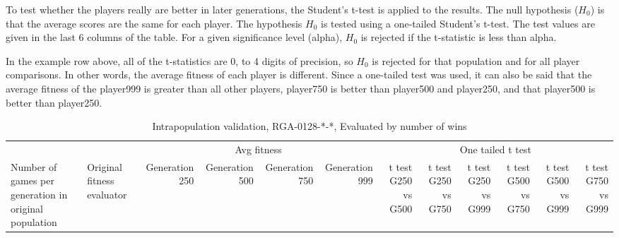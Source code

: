 \begin{landscape}
To test whether the players really are better in later generations, the
Student's t-test is applied to the results. The null hypothesis ($H_{0}$) is
that the average scores are the same for each player. The hypothesis $H_{0}$ 
is tested using a
one-tailed Student's t-test. The test values are given in the last 6 columns of
the table. For a given significance level (alpha), $H_{0}$ is rejected if the
t-statistic is less than alpha.

In the example row above, all of the t-statistics are 0, to 4 digits of
precision, so $H_{0}$ is rejected for that population and for all player
comparisons. In other words, the average fitness of each player is different.
Since a one-tailed test was used, it can also be said that the average fitness
of the player999 is greater than all other players, player750 is better than
player500 and player250, and that player500 is better than player250.

\clearpage

\begin{table}[ht]
  \centering
    \caption{Intrapopulation validation, RGA-0128-*-*, Evaluated by number of
    wins}
    \begin{tabularx}{\linewidth}{|p{1in}|p{1in}|r|r|r|r|r|r|r|r|r|r|}
\cline{3-12}    \multicolumn{1}{l}{} &  & \multicolumn{4}{c|}{Avg fitness} & \multicolumn{6}{c|}{One tailed t test} \\ \cline{1-12}
    Number of games per generation in original population
    & Original fitness evaluator 
    & \multicolumn{1}{p{0.7in}|}{Generation 250} 
    & \multicolumn{1}{p{0.7in}|}{Generation 500}
    & \multicolumn{1}{p{0.7in}|}{Generation 750}
    & \multicolumn{1}{p{0.7in}|}{Generation 999}
    & \multicolumn{1}{X|}{t test G250 vs G500} 
    & \multicolumn{1}{X|}{t test G250 vs G750}
    & \multicolumn{1}{X|}{t test G250 vs G999}
    & \multicolumn{1}{X|}{t test G500 vs G750}
    & \multicolumn{1}{X|}{t test G500 vs G999}
    & \multicolumn{1}{X|}{t test G750 vs G999} \\ \cline{1-12}


\end{tabularx}
\end{table}
\end{landscape}
